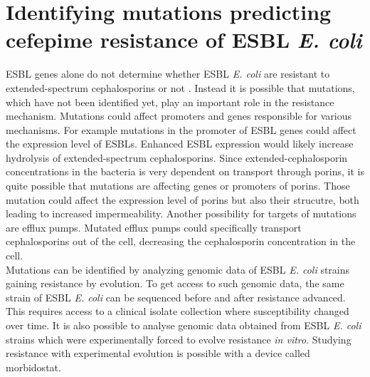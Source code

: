 \section{Identifying mutations predicting cefepime resistance of ESBL \textit{E. coli}}
ESBL genes alone do not determine whether ESBL \textit{E. coli} are resistant to extended-spectrum cephalosporins or not \cite{hombach_consequences_2013}. Instead it is possible that mutations, which have not been identified yet, play an important role in the resistance mechanism. Mutations could affect promoters and genes responsible for various mechanisms. For example mutations in the promoter of ESBL genes could affect the expression level of ESBLs. Enhanced ESBL expression would likely increase hydrolysis of extended-spectrum cephalosporins. Since extended-cephalosporin concentrations in the bacteria is very dependent on transport through porins, it is quite possible that mutations are affecting genes or promoters of porins. Those mutation could affect the expression level of porins but also their strucutre, both leading to increased impermeability. Another possibility for targets of mutations are efflux pumps. Mutated efflux pumps could specifically transport cephalosporins out of the cell, decreasing the cephalosporin concentration in the cell. \\
Mutations can be identified by analyzing genomic data of  ESBL \textit{E. coli} strains gaining resistance by evolution. To get access to such genomic data, the same strain of ESBL \textit{E. coli} can be sequenced before and after resistance advanced. This requires access to a clinical isolate collection where susceptibility changed over time. It is also possible to analyse genomic data obtained from ESBL \textit{E. coli} strains which were experimentally forced to evolve resistance \textit{in vitro}. Studying resistance with experimental evolution is possible with a device called morbidostat.

